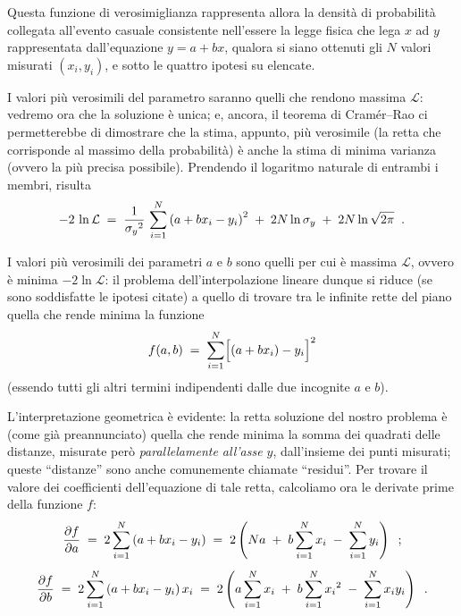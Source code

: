 Questa funzione di verosimiglianza rappresenta allora la
densit\`a di probabilit\`a collegata all'evento casuale
consistente nell'essere la legge fisica che lega $x$ ad $y$
rappresentata dall'equazione $y = a + bx$, qualora si siano
ottenuti gli $N$ valori misurati $(x_i, y_i)$, e sotto le
quattro ipotesi su elencate.%

I valori pi\`u verosimili del parametro saranno quelli che
rendono massima $\mathcal{L}$: vedremo ora che la soluzione
\`e unica; e, ancora, il teorema di Cram\'er--Rao%
ci permetterebbe di dimostrare che la stima, appunto, pi\`u
verosimile (la retta che corrisponde al massimo della
probabilit\`a) \`e anche la stima di minima varianza (ovvero
la pi\`u precisa possibile).  Prendendo il logaritmo
naturale di entrambi i membri, risulta
\begin{equation*}
  - 2 \, \ln\mathcal{L} \; = \;
  \frac{1}{{\sigma_y}^2} \,
  \sum_{i=1}^N \left( a + b x_i - y_i \right) ^2
  \; + \; 2 N \ln \sigma_y
  \; + \; 2 N \ln \sqrt{2 \pi} \;\; .
\end{equation*}

I valori pi\`u verosimili dei parametri $a$ e $b$ sono
quelli per cui \`e massima $\mathcal{L}$, ovvero \`e minima
$- 2 \ln\mathcal{L} $: il problema dell'interpolazione
lineare dunque si riduce (se sono soddisfatte le ipotesi
citate) a quello di trovare tra le infinite rette del piano
quella che rende minima la funzione
\begin{equation*}
  f(a,b) \; =  \;\sum_{i=1}^N \Bigl[ \left( a + b x_i
    \right) - y_i \Bigr] ^{2}
\end{equation*}
(essendo tutti gli altri termini indipendenti dalle due
incognite $a$ e $b$).

L'interpretazione geometrica \`e evidente: la retta
soluzione del nostro problema \`e (come gi\`a preannunciato)
quella che rende minima la somma dei quadrati delle
distanze, misurate per\`o \emph{parallelamente all'asse
  $y$}, dall'insieme dei punti misurati; queste ``distanze''
sono anche comunemente chiamate ``residui''.%
Per trovare il valore dei coefficienti dell'equazione di
tale retta, calcoliamo ora le derivate prime della funzione
$f$:
\begin{gather*}
  \frac{\partial f}{\partial a} \; = \;
    2 \sum_{i=1}^N \left( a + b x_i - y_i \right)
    \; = \; 2 \left( N a \; + \;
    b \sum_{i=1}^N x_i \; - \;
    \sum_{i=1}^N y_i \right) \;\; ; \\[1ex]
  \frac{\partial f}{\partial b} \; = \;
     2 \sum_{i=1}^N \left( a + b x_i - y_i \right) x_i
     \; = \; 2 \left( a \sum_{i=1}^N x_i \; + \;
     b \sum_{i=1}^N {x_i}^2 \; - \;
     \sum_{i=1}^N x_i y_i \right) \;\; .
\end{gather*}

